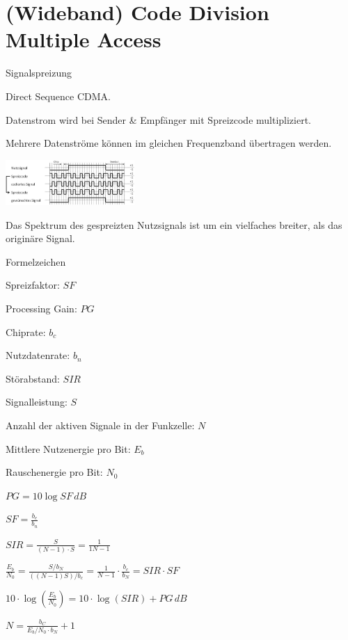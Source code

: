\documentclass[german]{latex4ei/latex4ei_sheet}
\begin{document}
\section{(Wideband) Code Division Multiple Access}
    \begin{sectionbox}
        \begin{bluebox}{Signalspreizung}
            \item Direct Sequence CDMA.
            \item Datenstrom wird bei Sender \& Empfänger mit Spreizcode multipliziert.
            \item Mehrere Datenströme können im gleichen Frequenzband übertragen werden.
            \item \includegraphics[width=185px]{img/Signalspreizung.png}
            \item Das Spektrum des gespreizten Nutzsignals ist um ein vielfaches breiter, als das originäre Signal. 
        \end{bluebox}
        \begin{symbolbox}{Formelzeichen}
            \item Spreizfaktor: $SF$
            \item Processing Gain: $PG$
            \item Chiprate: $b_c$
            \item Nutzdatenrate: $b_n$
            \item Störabstand: $SIR$
            \item Signalleistung: $S$
            \item Anzahl der aktiven Signale in der Funkzelle: $N$
            \item Mittlere Nutzenergie pro Bit: $E_b$
            \item Rauschenergie pro Bit: $N_0$
        \end{symbolbox}
        
        \begin{bluebox}
            \item $PG = 10\log SF\,dB$
            \item $SF = \frac{b_c}{b_n}$
            \item $SIR = \frac{S}{(N-1)\cdot S}= \frac{1}{1 N-1}$
            \item $\frac{E_b}{N_0} = \frac{S/b_N}{((N-1)S)/b_c} = \frac{1}{N-1}\cdot \frac{b_c}{b_N} = SIR \cdot SF$
            \item $10 \cdot \log \left(\frac{E_b}{N_0}\right) = 10\cdot \log (SIR)+ PG\,dB$
            \item $N = \frac{b_C}{E_b/N_0\cdot b_N}+1$
        \end{bluebox}
    \end{sectionbox}
\vspace{4cm}
\end{document}
